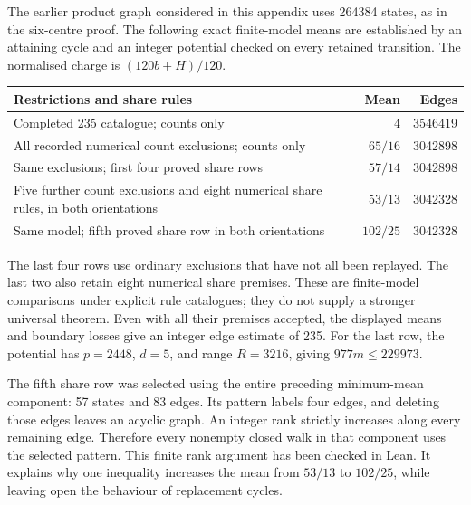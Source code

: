 \documentclass[11pt,a4paper]{article}
\theoremstyle{definition}
\theoremstyle{remark}
\begin{document}
The earlier product graph considered in this appendix uses 264384 states, as in the six-centre proof. The following exact finite-model means are established by an attaining cycle and an integer potential checked on every retained transition. The normalised charge is $(120b+H)/120$.
\begin{center}
\begin{tabular}{p{}rr}
\toprule
Restrictions and share rules & Mean & Edges\\\midrule
Completed 235 catalogue; counts only & $4$ & 3546419\\
All recorded numerical count exclusions; counts only & $65/16$ & 3042898\\
Same exclusions; first four proved share rows & $57/14$ & 3042898\\
Five further count exclusions and eight numerical share rules, in both orientations & $53/13$ & 3042328\\
Same model; fifth proved share row in both orientations & $102/25$ & 3042328\\
\bottomrule
\end{tabular}
\end{center}
The last four rows use ordinary exclusions that have not all been replayed. The last two also retain eight numerical share premises. These are finite-model comparisons under explicit rule catalogues; they do not supply a stronger universal theorem. Even with all their premises accepted, the displayed means and boundary losses give an integer edge estimate of 235. For the last row, the potential has $p=2448$, $d=5$, and range $R=3216$, giving $977m\le229973$.

The fifth share row was selected using the entire preceding minimum-mean component: 57 states and 83 edges. Its pattern labels four edges, and deleting those edges leaves an acyclic graph. An integer rank strictly increases along every remaining edge. Therefore every nonempty closed walk in that component uses the selected pattern. This finite rank argument has been checked in Lean. It explains why one inequality increases the mean from $53/13$ to $102/25$, while leaving open the behaviour of replacement cycles.
\end{document}
